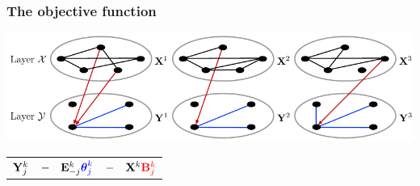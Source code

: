 \documentclass[10pt]{beamer}
\theoremstyle{definition}
\begin{document}
\begin{frame}
\frametitle{The objective function}

\begin{center}
\includegraphics[width=.9\textwidth]{multitwolayer_j}
\end{center}

\begin{center}
\begin{tabular}{ccc}%
$ {\mathbf{Y}}_j^k$ & $- \quad {\mathbf{E}}_{-j}^k {\color{blue}  {\boldsymbol{\theta}}_j^k}$ & $- \quad {\mathbf{X}}^k {\color{red} {\mathbf{B}}_j^k }$
\end{tabular}


\end{center}

\end{frame}
\end{document}
